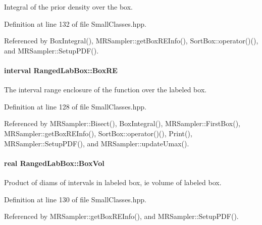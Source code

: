 \-Integral of the prior density over the box. 



\-Definition at line 132 of file \-Small\-Classes.\-hpp.



\-Referenced by \-Box\-Integral(), \-M\-R\-Sampler\-::get\-Box\-R\-E\-Info(), \-Sort\-Box\-::operator()(), and \-M\-R\-Sampler\-::\-Setup\-P\-D\-F().

\hypertarget{classRangedLabBox_ae8b300e377bb19858a20929900e56411}{
\paragraph[{\-Box\-R\-E}]{\setlength{\rightskip}{0pt plus 5cm}interval {\bf \-Ranged\-Lab\-Box\-::\-Box\-R\-E}}}\label{classRangedLabBox_ae8b300e377bb19858a20929900e56411}


\-The interval range enclosure of the function over the labeled box. 



\-Definition at line 128 of file \-Small\-Classes.\-hpp.



\-Referenced by \-M\-R\-Sampler\-::\-Bisect(), \-Box\-Integral(), \-M\-R\-Sampler\-::\-First\-Box(), \-M\-R\-Sampler\-::get\-Box\-R\-E\-Info(), \-Sort\-Box\-::operator()(), \-Print(), \-M\-R\-Sampler\-::\-Setup\-P\-D\-F(), and \-M\-R\-Sampler\-::update\-Umax().

\hypertarget{classRangedLabBox_a39c03a61c15dd970e865d0619e81fa03}{
\paragraph[{\-Box\-Vol}]{\setlength{\rightskip}{0pt plus 5cm}real {\bf \-Ranged\-Lab\-Box\-::\-Box\-Vol}}}\label{classRangedLabBox_a39c03a61c15dd970e865d0619e81fa03}


\-Product of diams of intervals in labeled box, ie volume of labeled box. 



\-Definition at line 130 of file \-Small\-Classes.\-hpp.



\-Referenced by \-M\-R\-Sampler\-::get\-Box\-R\-E\-Info(), and \-M\-R\-Sampler\-::\-Setup\-P\-D\-F().

